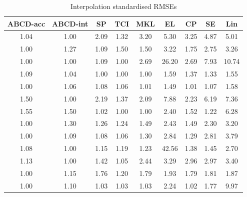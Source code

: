 \documentclass[letterpaper]{article}
\newcommand{\procedurename}{ABCD}
\begin{document}
\begin{table}[ht]
\center
\begin{tabular}{|c|c|c|c|c|c|c|c|c|}
\hline
\procedurename{}-acc & \procedurename{}-int & SP & TCI & MKL & EL & CP & SE & Lin \\
\hline
1.04 & 1.00 & 2.09 & 1.32 & 3.20 & 5.30 & 3.25 & 4.87 & 5.01\\
1.00 & 1.27 & 1.09 & 1.50 & 1.50 & 3.22 & 1.75 & 2.75 & 3.26\\
1.00 & 1.00 & 1.09 & 1.00 & 2.69 & 26.20 & 2.69 & 7.93 & 10.74\\
1.09 & 1.04 & 1.00 & 1.00 & 1.00 & 1.59 & 1.37 & 1.33 & 1.55\\
1.00 & 1.06 & 1.08 & 1.06 & 1.01 & 1.49 & 1.01 & 1.07 & 1.58\\
1.50 & 1.00 & 2.19 & 1.37 & 2.09 & 7.88 & 2.23 & 6.19 & 7.36\\
1.55 & 1.50 & 1.02 & 1.00 & 1.00 & 2.40 & 1.52 & 1.22 & 6.28\\
1.00 & 1.30 & 1.26 & 1.24 & 1.49 & 2.43 & 1.49 & 2.30 & 3.20\\
1.00 & 1.09 & 1.08 & 1.06 & 1.30 & 2.84 & 1.29 & 2.81 & 3.79\\
1.08 & 1.00 & 1.15 & 1.19 & 1.23 & 42.56 & 1.38 & 1.45 & 2.70\\
1.13 & 1.00 & 1.42 & 1.05 & 2.44 & 3.29 & 2.96 & 2.97 & 3.40\\
1.00 & 1.15 & 1.76 & 1.20 & 1.79 & 1.93 & 1.79 & 1.81 & 1.87\\
1.00 & 1.10 & 1.03 & 1.03 & 1.03 & 2.24 & 1.02 & 1.77 & 9.97\\
\hline
\end{tabular}
\caption{Interpolation standardised RMSEs}
\label{table:interp}
\end{table}
\end{document}
